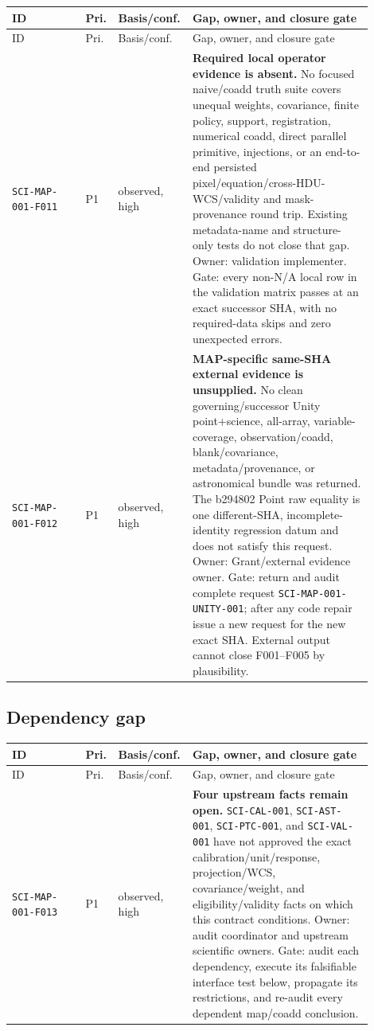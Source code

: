 \documentclass[11pt]{article}
\newcommand{\code}[1]{\nolinkurl{#1}}
\begin{document}
\begin{longtable}{L{0.20\linewidth}L{0.06\linewidth}L{0.15\linewidth}L{0.49\linewidth}}
\toprule
ID & Pri. & Basis/conf. & Gap, owner, and closure gate\\
\midrule
\endfirsthead
\toprule
ID & Pri. & Basis/conf. & Gap, owner, and closure gate\\
\midrule
\endhead
\code{SCI-MAP-001-F011} & P1 & observed, high &
\textbf{Required local operator evidence is absent.}  No focused naive/coadd
truth suite covers unequal weights, covariance, finite policy, support,
registration, numerical coadd, direct parallel primitive, injections, or an
end-to-end persisted pixel/equation/cross-HDU-WCS/validity and mask-provenance
round trip.  Existing
metadata-name and structure-only tests do not close that gap.  Owner: validation
implementer.  Gate: every
non-N/A local row in the validation matrix passes at an exact successor SHA,
with no required-data skips and zero unexpected errors.\\
\code{SCI-MAP-001-F012} & P1 & observed, high &
\textbf{MAP-specific same-SHA external evidence is unsupplied.}  No clean governing/successor
Unity point+science, all-array, variable-coverage, observation/coadd,
blank/covariance, metadata/provenance, or astronomical bundle was returned.
The b294802 Point raw equality is one different-SHA, incomplete-identity
regression datum and does not satisfy this request.
Owner: Grant/external evidence owner.  Gate: return and audit complete request
\code{SCI-MAP-001-UNITY-001}; after any code repair issue a new request for the
new exact SHA.  External output cannot close F001--F005 by plausibility.\\
\bottomrule
\end{longtable}

\subsection{Dependency gap}

\begin{longtable}{L{0.20\linewidth}L{0.06\linewidth}L{0.15\linewidth}L{0.49\linewidth}}
\toprule
ID & Pri. & Basis/conf. & Gap, owner, and closure gate\\
\midrule
\endfirsthead
\toprule
ID & Pri. & Basis/conf. & Gap, owner, and closure gate\\
\midrule
\endhead
\code{SCI-MAP-001-F013} & P1 & observed, high &
\textbf{Four upstream facts remain open.}  \code{SCI-CAL-001},
\code{SCI-AST-001}, \code{SCI-PTC-001}, and \code{SCI-VAL-001} have not
approved the exact calibration/unit/response, projection/WCS, covariance/weight,
and eligibility/validity facts on which this contract conditions.  Owner: audit
coordinator and upstream scientific owners.  Gate: audit each dependency,
execute its falsifiable interface test below, propagate its restrictions, and
re-audit every dependent map/coadd conclusion.\\
\bottomrule
\end{longtable}
\end{document}
